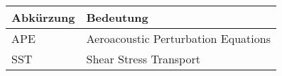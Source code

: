 \begin{longtable}[t]{p{}p{}}
	\textbf{Abkürzung}  & \textbf{Bedeutung}\\
	\midrule
	APE & Aeroacoustic Perturbation Equations \\
	SST & Shear Stress Transport \\
	
	
\end{longtable}
%
%	
%
%
%
%
%
%
%


\fi	
\cleardoublepage